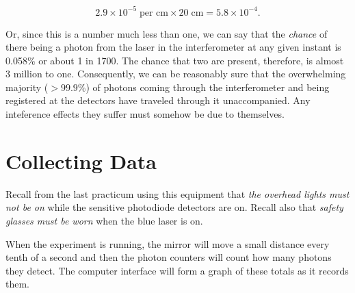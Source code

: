 \[2.9 \times 10^{-5} \; \text{per cm} \times 20 \; \text{cm} = 5.8 \times 10^{-4}. \]

Or, since this is a number much less than one, we can say that the \emph{chance} of there being a photon from the laser in the interferometer at any given instant is 0.058\% or about 1 in 1700. The chance that two are present, therefore, is almost 3 million to one. Consequently, we can be reasonably sure that the overwhelming majority ($> 99.9\%$) of photons coming through the interferometer and being registered at the detectors have traveled through it unaccompanied. Any inteference effects they suffer must somehow be due to themselves.

\section*{Collecting Data}

Recall from the last practicum using this equipment that \emph{the overhead lights must not be on} while the sensitive photodiode detectors are on.  Recall also that \emph{safety glasses must be worn} when the blue laser is on.

When the experiment is running, the mirror will move a small distance every tenth of a second and then the photon counters will count how many photons they detect. The computer interface will form a graph of these totals as it records them.

